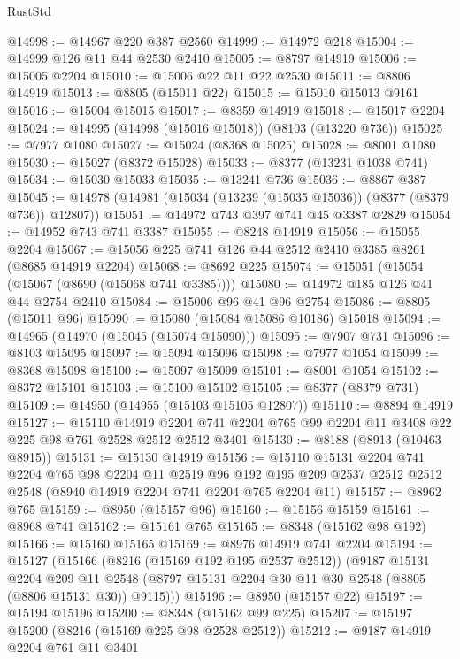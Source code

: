 \begin{lexlean}{RustStd}
\begin{coremodule}
{\begin{coremodule}
{{{{{{{{{{{{{{{{{{{{{{{{{{{{{{{{{{{{{{{{{{{{{{{{{{@14998 := @14967 @220 @387 @2560
@14999 := @14972 @218
@15004 := @14999 @126 @11 @44 @2530 @2410
@15005 := @8797 @14919
@15006 := @15005 @2204
@15010 := @15006 @22 @11 @22 @2530
@15011 := @8806 @14919
@15013 := @8805 (@15011 @22)
@15015 := @15010 @15013 @9161
@15016 := @15004 @15015
@15017 := @8359 @14919
@15018 := @15017 @2204
@15024 := @14995 (@14998 (@15016 @15018)) (@8103 (@13220 @736))
@15025 := @7977 @1080
@15027 := @15024 (@8368 @15025)
@15028 := @8001 @1080
@15030 := @15027 (@8372 @15028)
@15033 := @8377 (@13231 @1038 @741)
@15034 := @15030 @15033
@15035 := @13241 @736
@15036 := @8867 @387
@15045 := @14978 (@14981 (@15034 (@13239 (@15035 @15036)) (@8377 (@8379 @736)) @12807))
@15051 := @14972 @743 @397 @741 @45 @3387 @2829
@15054 := @14952 @743 @741 @3387
@15055 := @8248 @14919
@15056 := @15055 @2204
@15067 := @15056 @225 @741 @126 @44 @2512 @2410 @3385 @8261 (@8685 @14919 @2204)
@15068 := @8692 @225
@15074 := @15051 (@15054 (@15067 (@8690 (@15068 @741 @3385))))
@15080 := @14972 @185 @126 @41 @44 @2754 @2410
@15084 := @15006 @96 @41 @96 @2754
@15086 := @8805 (@15011 @96)
@15090 := @15080 (@15084 @15086 @10186) @15018
@15094 := @14965 (@14970 (@15045 (@15074 @15090)))
@15095 := @7907 @731
@15096 := @8103 @15095
@15097 := @15094 @15096
@15098 := @7977 @1054
@15099 := @8368 @15098
@15100 := @15097 @15099
@15101 := @8001 @1054
@15102 := @8372 @15101
@15103 := @15100 @15102
@15105 := @8377 (@8379 @731)
@15109 := @14950 (@14955 (@15103 @15105 @12807))
@15110 := @8894 @14919
@15127 := @15110
    @14919
    @2204
    @741
    @2204
    @765
    @99
    @2204
    @11
    @3408
    @22
    @225
    @98
    @761
    @2528
    @2512
    @2512
    @3401
@15130 := @8188 (@8913 (@10463 @8915))
@15131 := @15130 @14919
@15156 := @15110
    @15131
    @2204
    @741
    @2204
    @765
    @98
    @2204
    @11
    @2519
    @96
    @192
    @195
    @209
    @2537
    @2512
    @2512
    @2548
    (@8940 @14919 @2204 @741 @2204 @765 @2204 @11)
@15157 := @8962 @765
@15159 := @8950 (@15157 @96)
@15160 := @15156 @15159
@15161 := @8968 @741
@15162 := @15161 @765
@15165 := @8348 (@15162 @98 @192)
@15166 := @15160 @15165
@15169 := @8976 @14919 @741 @2204
@15194 := @15127
    (@15166
      (@8216 (@15169 @192 @195 @2537 @2512))
      (@9187
        @15131
        @2204
        @209
        @11
        @2548
        (@8797 @15131 @2204 @30 @11 @30 @2548 (@8805 (@8806 @15131 @30)) @9115)))
@15196 := @8950 (@15157 @22)
@15197 := @15194 @15196
@15200 := @8348 (@15162 @99 @225)
@15207 := @15197 @15200 (@8216 (@15169 @225 @98 @2528 @2512))
@15212 := @9187 @14919 @2204 @761 @11 @3401
}}}}}}}}}}}}}}}}}}}}}}}}}}}}}}}}}}}}}}}}}}}}}}}}}}
\end{coremodule}}
\end{coremodule}
\end{lexlean}
